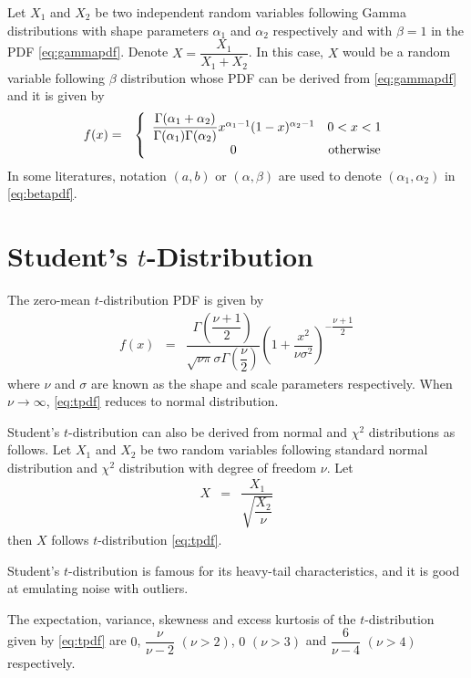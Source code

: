 Let $X_1$ and $X_2$ be two independent random variables following Gamma distributions with shape parameters $\alpha_1$ and $\alpha_2$ respectively and with $\beta = 1$ in the PDF \eqref{eq:gammapdf}. Denote $X=\dfrac{X_1}{X_1+X_2}$. In this case, $X$ would be a random variable following $\beta$ distribution whose PDF can be derived from \eqref{eq:gammapdf} and it is given by
\begin{eqnarray}
  f(x) &=& \left\{\begin{array}{cc}
                    \dfrac{\Gamma(\alpha_1 + \alpha_2)}{\Gamma(\alpha_1)\Gamma(\alpha_2)}x^{\alpha_1-1}(1-x)^{\alpha_2-1} & 0 < x < 1 \\
                    0 & \textup{otherwise}
                  \end{array}\right. \label{eq:betapdf}
\end{eqnarray}
In some literatures, notation $(a, b)$ or $(\alpha, \beta)$ are used to denote $(\alpha_1, \alpha_2)$ in \eqref{eq:betapdf}.

\section{Student's $t$-Distribution}



The zero-mean $t$-distribution PDF is given by
\begin{eqnarray}
	f(x) &=& \dfrac{\Gamma\left(\dfrac{\nu+1}{2}\right)}{\sqrt{\nu\pi}\sigma\Gamma\left(\dfrac{\nu}{2}\right)}\left(1+\dfrac{x^2}{\nu\sigma^2}\right)^{-\dfrac{\nu+1}{2}} \label{eq:tpdf}
\end{eqnarray}
where $\nu$ and $\sigma$ are known as the shape and scale parameters respectively. When $\nu\rightarrow\infty$, \eqref{eq:tpdf} reduces to normal distribution. 

Student's $t$-distribution can also be derived from normal and $\chi^2$ distributions as follows. Let $X_1$ and $X_2$ be two random variables following standard normal distribution and $\chi^2$ distribution with degree of freedom $\nu$. Let
\begin{eqnarray}
	X &=& \dfrac{X_1}{\sqrt{\dfrac{X_2}{\nu}}} \nonumber
\end{eqnarray}
then $X$ follows $t$-distribution \eqref{eq:tpdf}.

Student's $t$-distribution is famous for its heavy-tail characteristics, and it is good at emulating noise with outliers.

The expectation, variance, skewness and excess kurtosis of the $t$-distribution given by \eqref{eq:tpdf} are $0$, $\dfrac{\nu}{\nu-2}$ $(\nu>2)$, $0$ $(\nu>3)$ and $\dfrac{6}{\nu-4}$ $(\nu>4)$ respectively.

